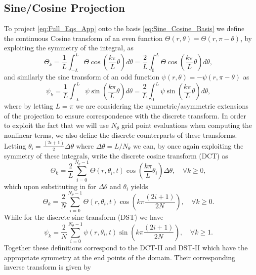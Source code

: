 \documentclass[a4paper]{article}
\begin{document}
\subsection{Sine/Cosine Projection}

To project \eqref{eq:Full_Eqs_App} onto the basis \eqref{eq:Sine_Cosine_Basis} we define the continuous Cosine transform of an even function $\Theta(r,\theta) = \Theta(r,\pi - \theta)$, by exploiting the symmetry of the integral, as
\begin{equation}
    \Theta_k = \frac{1}{L} \int_{-L}^{L} \Theta \cos \left(\frac{k \pi}{L} \theta \right) d \theta = \frac{2}{L} \int_0^{L} \Theta \cos \left(\frac{k \pi}{L} \theta \right) d \theta,
\end{equation} 
and similarly the sine transform of an odd function $\psi(r,\theta) = -\psi(r,\pi - \theta)$ as
\begin{equation}
    \psi_k = \frac{1}{L} \int_{-L}^{L} \psi \sin \left(\frac{k \pi}{L} \theta \right) d \theta = \frac{2}{L} \int_{0}^{L} \psi \sin \left(\frac{k \pi}{L} \theta \right) d \theta,
\end{equation}
where by letting $L = \pi$ we are considering the symmetric/asymmetric extensions of the projection to ensure correspondence with the discrete transform. In order to exploit the fact that we will use $N_{\theta}$ grid point evaluations when computing the nonlinear terms, we also define the discrete counterparts of these transforms. Letting $\theta_i = \frac{(2i + 1)}{2} \Delta \theta$ where $\Delta \theta = L/N_{\theta}$ we can, by once again exploiting the symmetry of these integrals, write the discrete cosine transform (DCT) as
\begin{equation}
\Theta_k = \frac{2}{L} \sum_{i=0}^{N_{\theta}-1}  \Theta(r,\theta_i,t) \cos(\frac{k \pi}{L} \theta_i) \Delta \theta, \quad \forall k \geq 0,
\end{equation}
which upon substituting in for $\Delta \theta$ and $\theta_i$ yields
\begin{equation}
    \Theta_k = \frac{2}{N} \sum_{i=0}^{N_{\theta}-1} \Theta(r,\theta_i,t) \cos(k\pi \frac{(2i + 1)}{2N}), \quad \forall k \geq 0.
\end{equation}
While for the discrete sine transform (DST) we have 
\begin{equation}
    \psi_k = \frac{2}{N} \sum_{i=0}^{N_{\theta}-1} \psi(r,\theta_i,t) \sin(k\pi \frac{(2i + 1)}{2N}), \quad \forall k \geq 1.
\end{equation}
Together these definitions correspond to the DCT-II and DST-II which have the appropriate symmetry at the end points of the domain. Their corresponding inverse transform is given by 
\end{document}
